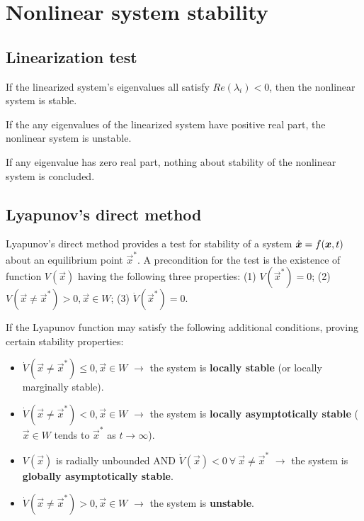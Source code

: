 
\chapter{Nonlinear system stability}

\section{Linearization test}

If the linearized system's eigenvalues all satisfy $Re(\lambda_i) < 0$, then the nonlinear system is stable.

If the any eigenvalues of the linearized system have positive real part, the nonlinear system is unstable.

If any eigenvalue has zero real part, nothing about stability of the nonlinear system is concluded.

\section{Lyapunov's direct method}

Lyapunov's direct method provides a test for stability of a system $\dot{\bm{x}} = f(\bm{x},t)$ about an equilibrium point $\vec{x}^*$. A precondition for the test is the existence of function $V(\vec{x})$ having the following three properties: (1) $V(\vec{x}^*) = 0$; (2) $V(\vec{x}\neq \vec{x}^*) > 0, \vec{x}\in W$; (3) $\dot{V}(\vec{x}^*) = 0$.

If the Lyapunov function may satisfy the following additional conditions, proving certain stability properties:

\begin{itemize}
	\item $\dot{V}(\vec{x}\neq\vec{x}^*) \leq 0, \vec{x}\in W$ $\rightarrow$ the system is \textbf{locally stable} (or locally marginally stable).
	\item $\dot{V}(\vec{x}\neq\vec{x}^*) < 0, \vec{x}\in W$ $\rightarrow$ the system is \textbf{locally asymptotically stable} ($\vec{x} \in W$ tends to $\vec{x}^*$ as $t\rightarrow\infty$).
	\item $V(\vec{x})$ is radially unbounded AND $\dot{V}(\vec{x}) < 0 \ \forall \ \vec{x}\neq\vec{x}^*$ $\rightarrow$ the system is \textbf{globally asymptotically stable}.
	\item $\dot{V}(\vec{x}\neq\vec{x}^*) > 0, \vec{x}\in W$ $\rightarrow$ the system is \textbf{unstable}.
\end{itemize}

